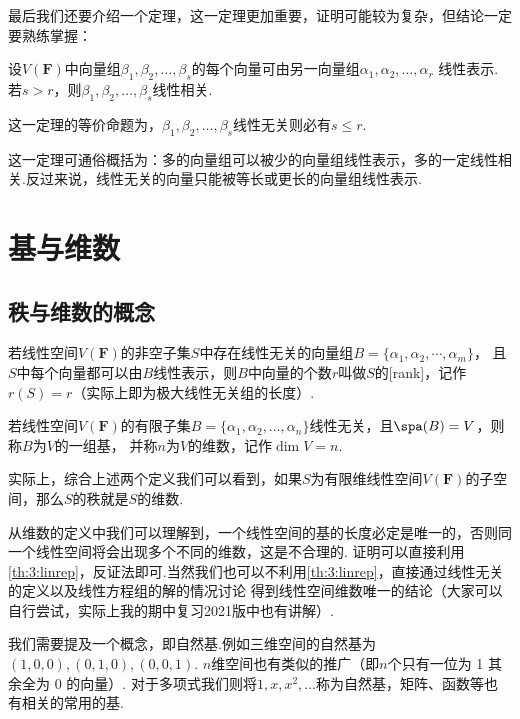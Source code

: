 最后我们还要介绍一个定理，这一定理更加重要，证明可能较为复杂，但结论一定要熟练掌握：
\begin{theorem}\label{th:3:linrep}
    设$V(\mathbf{F})$中向量组$ \beta_1,\beta_2,\ldots,\beta_s $的每个向量可由另一向量组$\alpha_1,\alpha_2,\ldots,\alpha_r$
    线性表示.若$s>r$，则$ \beta_1,\beta_2,\ldots,\beta_s $线性相关.
\end{theorem}
这一定理的等价命题为，$ \beta_1,\beta_2,\ldots,\beta_s $线性无关则必有$s\leqslant r$.

这一定理可通俗概括为：多的向量组可以被少的向量组线性表示，多的一定线性相关.反过来说，线性无关的向量只能被等长或更长的向量组线性表示.

\section{基与维数}
\subsection{秩与维数的概念}
\begin{definition}
	若线性空间$V(\mathbf{F})$的非空子集$S$中存在线性无关的向量组$B=\{\alpha_1,\alpha_2,\cdots,\alpha_m\}$，
	且$S$中每个向量都可以由$B$线性表示，则$B$中向量的个数$r$叫做$S$的[rank]，记作$r(S)= r$（实际上即为极大线性无关组的长度）.
\end{definition}
\begin{definition}
    若线性空间$V(\mathbf{F})$的有限子集$B=\{\alpha_1,\alpha_2,\ldots,\alpha_n\}$线性无关，且$\spa(B) = V$，则称$B$为$V$的一组基，
    并称$n$为$V$的维数，记作$\dim V = n$.
\end{definition}
实际上，综合上述两个定义我们可以看到，如果$S$为有限维线性空间$V(\mathbf{F})$的子空间，那么$S$的秩就是$S$的维数.

从维数的定义中我们可以理解到，一个线性空间的基的长度必定是唯一的，否则同一个线性空间将会出现多个不同的维数，这是不合理的.
证明可以直接利用\autoref{th:3:linrep}，反证法即可.当然我们也可以不利用\autoref*{th:3:linrep}，直接通过线性无关的定义以及线性方程组的解的情况讨论
得到线性空间维数唯一的结论（大家可以自行尝试，实际上我的期中复习2021版中也有讲解）.

我们需要提及一个概念，即自然基.例如三维空间的自然基为$(1,0,0),(0,1,0),(0,0,1)$. $n$维空间也有类似的推广（即$n$个只有一位为 1 其余全为 0 的向量）.
对于多项式我们则将$1,x,x^2,\ldots$称为自然基，矩阵、函数等也有相关的常用的基.

